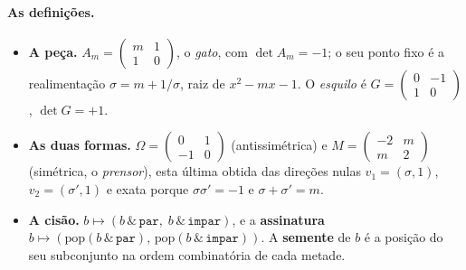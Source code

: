\documentclass[11pt]{article}
\theoremstyle{plain}
\theoremstyle{remark}
\begin{document}
\paragraph{As definições.}
\begin{itemize}\itemsep2pt
\item \textbf{A peça.} $A_m=\left(\begin{smallmatrix}m&1\\1&0\end{smallmatrix}\right)$, o \emph{gato},
com $\det A_m=-1$; o seu ponto fixo é a realimentação $\sigma=m+1/\sigma$, raiz de $x^2-mx-1$. O
\emph{esquilo} é $G=\left(\begin{smallmatrix}0&-1\\1&0\end{smallmatrix}\right)$, $\det G=+1$.
\item \textbf{As duas formas.} $\Omega=\left(\begin{smallmatrix}0&1\\-1&0\end{smallmatrix}\right)$
(antissimétrica) e $M=\left(\begin{smallmatrix}-2&m\\m&2\end{smallmatrix}\right)$ (simétrica, o
\emph{prensor}), esta última obtida das direções nulas $v_1=(\sigma,1)$, $v_2=(\sigma',1)$ e exata
porque $\sigma\sigma'=-1$ e $\sigma+\sigma'=m$.
\item \textbf{A cisão.} $b\mapsto(b\,\&\,\mathtt{par},\;b\,\&\,\mathtt{impar})$, e a
\textbf{assinatura} $b\mapsto(\mathrm{pop}(b\,\&\,\mathtt{par}),\,\mathrm{pop}(b\,\&\,\mathtt{impar}))$.
A \textbf{semente} de $b$ é a posição do seu subconjunto na ordem combinatória de cada metade.
\end{itemize}
\end{document}
